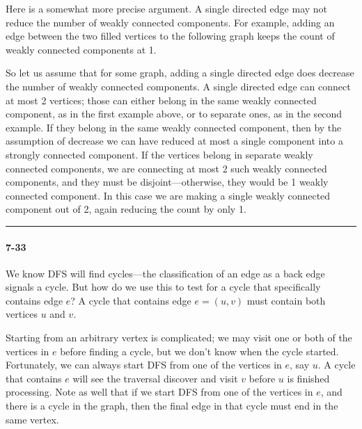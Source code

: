 \documentclass{report}
\newcommand{\okthen}{\rule[-1.4pt]{0.3em}{0.77em}}
\begin{document}
Here is a somewhat more precise argument. A single directed edge may not reduce the number of weakly connected components. For example, adding an edge between the two filled vertices to the following graph keeps the count of weakly connected components at 1.
\begin{center}
\end{center}

So let us assume that for some graph, adding a single directed edge does decrease the number of weakly connected components. A single directed edge can connect at most 2 vertices; those can either belong in the same weakly connected component, as in the first example above, or to separate ones, as in the second example. If they belong in the same weakly connected component, then by the assumption of decrease we can have reduced at most a single component into a strongly connected component. If the vertices belong in separate weakly connected components, we are connecting at most 2 such weakly connected components, and they must be disjoint---otherwise, they would be 1 weakly connected component. In this case we are making a single weakly connected component out of 2, again reducing the count by only 1.\ \okthen

\paragraph{7-33} We know DFS will find cycles---the classification of an edge as a back edge signals a cycle. But how do we use this to test for a cycle that specifically contains edge $e$? A cycle that contains edge $e = (u,v)$ must contain both vertices $u$ and $v$.

Starting from an arbitrary vertex is complicated; we may visit one or both of the vertices in $e$ before finding a cycle, but we don't know when the cycle started. Fortunately, we can always start DFS from one of the vertices in $e$, say $u$. A cycle that contains $e$ will see the traversal discover and visit $v$ before $u$ is finished processing.  Note as well that if we start DFS from one of the vertices in $e$, and there is a cycle in the graph, then the final edge in that cycle must end in the same vertex.
\end{document}
